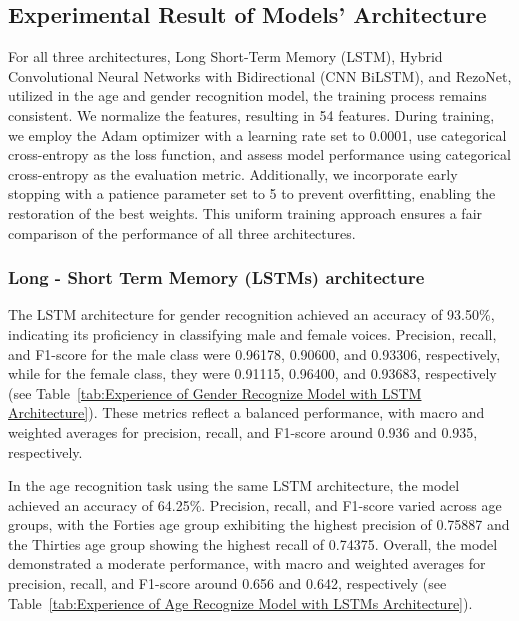 \documentclass[conference, 10pt,onecolumn]{IEEEtran}
\begin{document}
\subsection{Experimental Result of Models' Architecture}

For all three architectures, Long Short-Term Memory (LSTM), Hybrid Convolutional Neural Networks with Bidirectional (CNN BiLSTM), and RezoNet, utilized in the age and gender recognition model, the training process remains consistent. We normalize the features, resulting in 54 features. During training, we employ the Adam optimizer with a learning rate set to 0.0001, use categorical cross-entropy as the loss function, and assess model performance using categorical cross-entropy as the evaluation metric. Additionally, we incorporate early stopping with a patience parameter set to 5 to prevent overfitting, enabling the restoration of the best weights. This uniform training approach ensures a fair comparison of the performance of all three architectures.

\subsubsection{Long - Short Term Memory (LSTMs) architecture}

The LSTM architecture for gender recognition achieved an accuracy of 93.50\%, indicating its proficiency in classifying male and female voices. Precision, recall, and F1-score for the male class were 0.96178, 0.90600, and 0.93306, respectively, while for the female class, they were 0.91115, 0.96400, and 0.93683, respectively (see Table~\ref{tab:Experience of Gender Recognize Model with LSTM Architecture}). These metrics reflect a balanced performance, with macro and weighted averages for precision, recall, and F1-score around 0.936 and 0.935, respectively.

In the age recognition task using the same LSTM architecture, the model achieved an accuracy of 64.25\%. Precision, recall, and F1-score varied across age groups, with the Forties age group exhibiting the highest precision of 0.75887 and the Thirties age group showing the highest recall of 0.74375. Overall, the model demonstrated a moderate performance, with macro and weighted averages for precision, recall, and F1-score around 0.656 and 0.642, respectively (see Table~\ref{tab:Experience of Age Recognize Model with LSTMs Architecture}).
\end{document}
